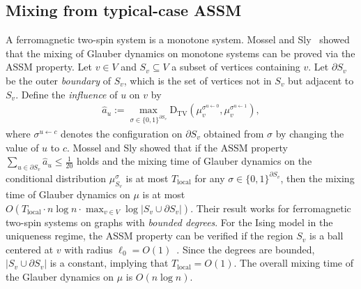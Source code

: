 \documentclass[11pt]{amsart}
\def\-#1{\mathrm{#1}}
\newcommand{\defeq}{:=}
\newcommand{\DTV}[2]{\-D_{\mathrm{TV}}\left({#1},{#2}\right)}
\theoremstyle{definition}
\theoremstyle{remark}
\begin{document}
\subsection{Mixing from typical-case ASSM}
A ferromagnetic two-spin system is a monotone system. 
Mossel and Sly~\cite{MS13} showed that the mixing of Glauber dynamics on monotone systems can be proved via the ASSM property. 
Let $v \in V$ and $S_v \subseteq V$  a subset of vertices containing $v$. Let $\partial S_v$ be the outer \emph{boundary} of $S_v$, which is the set of vertices not in $S_v$ but adjacent to $S_v$. Define the \emph{influence} of $u$ on $v$ by
\begin{align}\label{eq:influence-intro}
  \widehat{a}_u \defeq \max_{\sigma \in \{0,1\}^{\partial S_v}} \DTV{\mu^{\sigma^{u \gets 0}}_v}{\mu^{\sigma^{u \gets 1}}_v},
\end{align}
where $\sigma^{u \gets c}$ denotes the configuration on $\partial S_v$ obtained from $\sigma$ by changing the value of $u$ to $c$.
Mossel and Sly showed that if the ASSM property $\sum_{u \in \partial S_v} \widehat{a}_u \leq \frac{1}{20}$ holds and the mixing time of Glauber dynamics on the conditional distribution $\mu^{\sigma}_{S_v}$ is at most $T_{\text{local}}$ for any $\sigma \in \{0,1\}^{\partial S_v}$, then the mixing time of Glauber dynamics on $\mu$ is at most $O(T_{\text{local}} \cdot n \log n \cdot \max_{v \in V} \log |S_v \cup \partial S_v|)$.
Their result works for ferromagnetic two-spin systems on graphs with \emph{bounded degrees}. 
For the Ising model in the uniqueness regime, the ASSM property can be verified if the region $S_v$ is a ball centered at $v$ with radius $\ell_0 = O(1)$~\cite{MS13}.
Since the degrees are bounded, $|S_v \cup \partial S_v|$ is a constant, implying that $T_{\text{local}} = O(1)$. The overall mixing time of the Glauber dynamics on $\mu$ is $O(n \log n)$.
\end{document}
